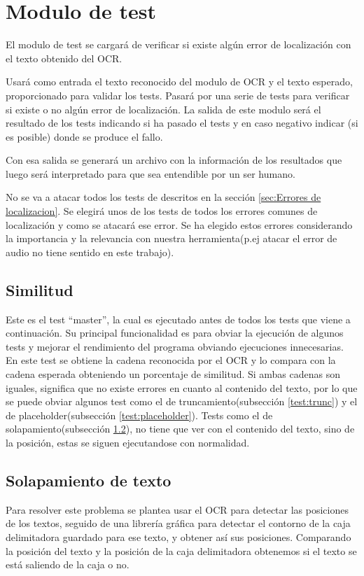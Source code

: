 \section{Modulo de test}
El modulo de test se cargará de verificar si existe algún error de localización con el texto obtenido del OCR.

Usará como entrada el texto reconocido del modulo de OCR y el texto esperado, proporcionado para validar los tests. Pasará por una serie de tests para verificar si existe o no algún error de localización. La salida de este modulo será el resultado de los tests indicando si ha pasado el tests y en caso negativo indicar (si es posible) donde se produce el fallo.

Con esa salida se generará un archivo con la información de los resultados que luego será interpretado para que sea entendible por un ser humano.

No se va a atacar todos los tests de descritos en la sección \ref{sec:Errores de localizacion}. 
Se elegirá unos de los tests de todos los errores comunes de localización y como se atacará ese error. Se ha elegido estos errores considerando la importancia y la relevancia con nuestra herramienta(p.ej atacar el error de audio no tiene sentido en este trabajo).
\subsection{Similitud}
\label{test:Simi}
Este es el test ``master'', la cual es ejecutado antes de todos los tests que viene a continuación. Su principal funcionalidad es para obviar la ejecución de algunos tests y mejorar el rendimiento del programa obviando ejecuciones innecesarias. En este test se obtiene la cadena reconocida por el OCR y lo compara con la cadena esperada obteniendo un porcentaje de similitud. Si ambas cadenas son iguales, significa que no existe errores en cuanto al contenido del texto, por lo que se puede obviar algunos test como el de truncamiento(subsección \ref{test:trunc}) y el de placeholder(subsección \ref{test:placeholder}). Tests como el de solapamiento(subsección \ref{test:overlap}), no tiene que ver con el contenido del texto, sino de la posición, estas se siguen ejecutandose con normalidad.

\subsection{Solapamiento de texto}
\label{test:overlap}
Para resolver este problema se plantea usar el OCR para detectar las posiciones de los textos, seguido de una librería gráfica para detectar el contorno de la caja delimitadora guardado para ese texto, y obtener así sus posiciones. Comparando la posición del texto y la posición de la caja delimitadora obtenemos si el texto se está saliendo de la caja o no.

